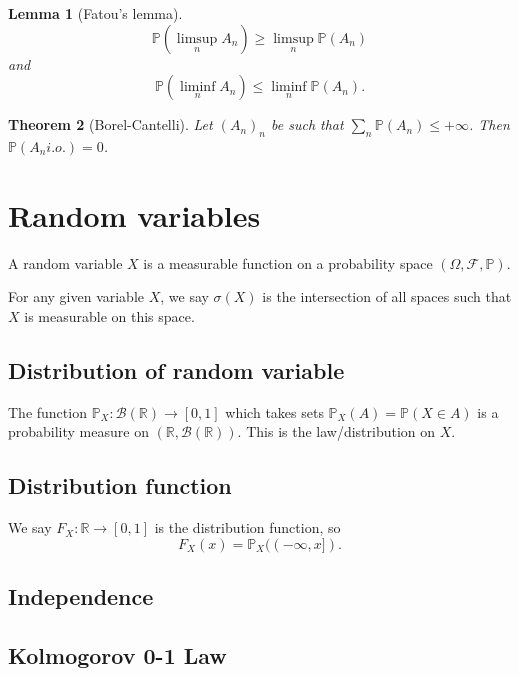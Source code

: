\documentclass{article}
\newtheorem{theorem}{Theorem}
\newtheorem{lemma}[theorem]{Lemma}
\theoremstyle{definition}
\numberwithin{theorem}{section}
\numberwithin{equation}{section}
\begin{document}
\begin{lemma}[Fatou's lemma]
	\begin{equation}
		\mathbb{P}(\limsup_n A_n) \geq \limsup_n \mathbb{P}(A_n)
	\end{equation} and \begin{equation}
	\mathbb{P}(\liminf_n A_n) \leq \liminf_n \mathbb{P}(A_n).
	\end{equation}
\end{lemma}

\begin{theorem}[Borel-Cantelli]
	Let $(A_n)_n$ be such that $\sum_n \mathbb{P}(A_n) \leq +\infty$. Then $\mathbb{P}(A_n i.o.) = 0$. 
\end{theorem}


\section{Random variables}
A random variable $X$ is a measurable function on a probability space  $(\Omega, \mathcal{F}, \mathbb{P})$. 

For any given variable $X$, we say $\sigma(X)$ is the intersection of all spaces such that $X$ is measurable on this space. 

\subsection{Distribution of random variable}

The function $\mathbb{P}_X: \mathcal{B}(\mathbb{R}) \rightarrow [0,1]$ which takes sets $\mathbb{P}_X(A) = \mathbb{P}(X \in A)$ is a probability measure on $(\mathbb{R}, \mathcal{B}(\mathbb{R}))$. This is the law/distribution on $X$. 

\subsection{Distribution function}
We say $F_X : \mathbb{R} \rightarrow [0, 1]$ is the distribution function, so
\begin{equation}
	F_X(x) = \mathbb{P}_X((-\infty, x]).
\end{equation}

\subsection{Independence}
 
 
\subsection{Kolmogorov 0-1 Law}
\end{document}
